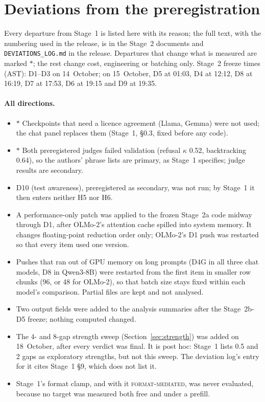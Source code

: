 \documentclass[11pt]{article}
\newcommand{\verdict}[1]{\textsc{\MakeLowercase{#1}}}
\begin{document}



\appendix
\section{Deviations from the preregistration}\label{app:deviations}
Every departure from Stage~1 is listed here with its reason; the full text, with the numbering used in the release, is in the Stage~2 documents and \texttt{DEVIATIONS\_LOG.md} in the release. Departures that change what is measured are marked $\ast$; the rest change cost, engineering or batching only. Stage~2 freeze times (AST): D1--D3 on 14~October; on 15~October, D5 at 01:03, D4 at 12:12, D8 at 16:19, D7 at 17:53, D6 at 19:15 and D9 at 19:35.

\paragraph{All directions.}
\begin{itemize}
\item $\ast$ Checkpoints that need a licence agreement (Llama, Gemma) were not used; the chat panel replaces them (Stage~1, \S0.3, fixed before any code).
\item $\ast$ Both preregistered judges failed validation (refusal $\kappa$ 0.52, backtracking 0.64), so the authors' phrase lists are primary, as Stage~1 specifies; judge results are secondary.
\item D10 (test awareness), preregistered as secondary, was not run; by Stage~1 it then enters neither H5 nor H6.
\item A performance-only patch was applied to the frozen Stage~2a code midway through D1, after OLMo-2's attention cache spilled into system memory. It changes floating-point reduction order only; OLMo-2's D1 push was restarted so that every item used one version.
\item Pushes that ran out of GPU memory on long prompts (D4G in all three chat models, D8 in Qwen3-8B) were restarted from the first item in smaller row chunks (96, or 48 for OLMo-2), so that batch size stays fixed within each model's comparison. Partial files are kept and not analysed.
\item Two output fields were added to the analysis summaries after the Stage~2b-D5 freeze; nothing computed changed.
\item The 4- and 8-gap strength sweep (Section~\ref{sec:strength}) was added on 18~October, after every verdict was final. It is post hoc: Stage~1 lists 0.5 and 2 gaps as exploratory strengths, but not this sweep. The deviation log's entry for it cites Stage~1 \S9, which does not list it.
\item Stage~1's format clamp, and with it \verdict{FORMAT-MEDIATED}, was never evaluated, because no target was measured both free and under a prefill.
\end{itemize}
\end{document}

